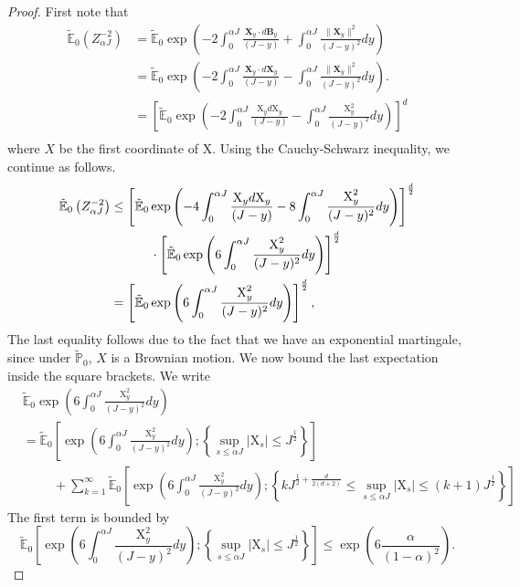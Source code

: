 \documentclass[12pt]{amsart}
\numberwithin{equation}{section}
\theoremstyle{definition}
\numberwithin{equation}{section}
\newcommand{\be}{\begin{equation}}
\newcommand{\ee}{\end{equation}}
\newcommand{\mP}{\mathbb{P}}
\newcommand{\X}{\mathbf{X}}
\newcommand{\E}{\mathbb{E}}
\begin{document}
\begin{proof}
First note that
\begin{align*}
\tilde{\E}_0\left(Z_{\alpha J}^{-2}\right) &= \tilde{\E}_0 \exp\left(-2\int_0^{\alpha J}\frac{\X_y \cdot d\mathbf{B}_y}{(J-y)} +\int_0^{\alpha J}\frac{\|\X_y\|^2}{(J-y)^2}dy \right) \\
&=  \tilde{\E}_0 \exp\left(-2\int_0^{\alpha J}\frac{\X_y \cdot 
  d\mathbf{X}_y}{(J-y)} -\int_0^{\alpha J}\frac{\|\X_y\|^2}{(J-y)^2}dy \right).  \\
& = \left[ \tilde{\E}_0 \exp\left(-2\int_0^{\alpha J}\frac{\text{X}_y d\text{X}_y}{(J-y)}- \int_0^{\alpha J}\frac{\text{X}_y^2}{(J-y)^2}dy \right)\right]^d \\
\end{align*}
where $X$ be the first coordinate of $\text{X}$.  
Using the Cauchy-Schwarz inequality, we continue as follows.  
\be\label{eq:poa:1}
\begin{split}
\tilde{\E}_0\left(Z_{\alpha J}^{-2}\right)
& \leq \left[ \tilde{\E}_0 \exp\left(-4\int_0^{\alpha J}\frac{\text{X}_y d\text{X}_y}{(J-y)} -8\int_0^{\alpha J}\frac{\text{X}_y^2}{(J-y)^2}dy \right)\right]^{\frac{d}{2}} \\
& \hspace{1.1cm} \cdot\left[ \tilde{\E}_0 \exp\left(6\int_0^{\alpha J}\frac{\text{X}_y^2}{(J-y)^2}dy \right)\right]^{\frac{d}{2}} \\
&=\left[ \tilde{\E}_0 \exp\left(6\int_0^{\alpha J}\frac{\text{X}_y^2}{(J-y)^2}dy \right)\right]^{\frac{d}{2}},
\end{split}
\ee
The last equality follows due to the fact that we have an exponential martingale, since under $\tilde{\mP}_0$, $X$ is a Brownian motion. We now bound the last expectation inside the square brackets. We write 
\begin{align*}
& \tilde{\E}_0 \exp\left(6\int_0^{\alpha J}\frac{\text{X}_y^2}{(J-y)^2}dy \right) \\
& = \tilde{\E}_0 \left[\exp\left(6\int_0^{\alpha J}\frac{\text{X}_y^2}{(J-y)^2}dy \right) ; \left\{\sup_{s\le \alpha J}|\text{X}_s|\le J^{\frac12}\right\} \right] \\
&\hspace{1cm} +\sum_{k=1}^\infty\tilde{\E}_0 \left[\exp\left(6\int_0^{\alpha J}\frac{\text{X}_y^2}{(J-y)^2}dy \right) ; \left\{k J^{\frac12+\frac{d}{2(d+2)}}\le \sup_{s\le \alpha J}|\text{X}_s|\le (k+1) J^{\frac12}\right\} \right]
\end{align*}
The first term is bounded by 
\[ \tilde{\E}_0 \left[\exp\left(6\int_0^{\alpha J}\frac{\text{X}_y^2}{(J-y)^2}dy \right) ; \left\{\sup_{s\le \alpha J}|\text{X}_s|\le J^{\frac12}\right\} \right] \le \exp\left(6\frac{\alpha }{(1-\alpha)^2}\right).\]

\end{proof}
\end{document}
